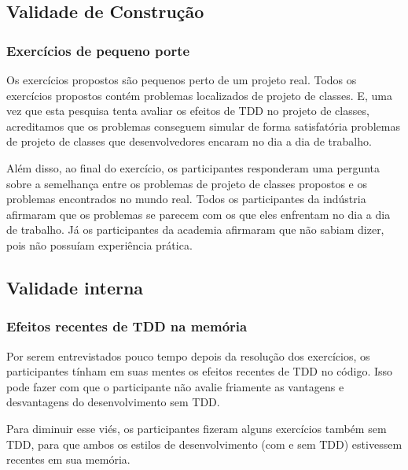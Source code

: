 \documentclass[conference]{IEEEtran}
\begin{document}
\subsection{Validade de Construção}

\subsubsection{Exercícios de pequeno porte}

Os exercícios propostos são pequenos perto de um projeto real. Todos os exercícios propostos contém
problemas localizados de projeto de classes. E, uma vez que esta pesquisa tenta avaliar os 
efeitos de TDD no projeto de classes, 
acreditamos que os problemas conseguem simular de forma satisfatória
problemas de projeto de classes que desenvolvedores encaram no dia a dia de trabalho.

Além disso, ao final do exercício, os participantes responderam uma pergunta sobre a semelhança
entre os problemas de projeto de classes propostos e os problemas encontrados no mundo real.
Todos os participantes da indústria afirmaram que os problemas se parecem com os que eles enfrentam
no dia a dia de trabalho. Já os participantes da academia afirmaram que não sabiam dizer, pois não
possuíam experiência prática.

\subsection{Validade interna}

\subsubsection{Efeitos recentes de TDD na memória}

Por serem entrevistados pouco tempo depois da resolução dos exercícios, os participantes tínham
em suas mentes os efeitos recentes de TDD no código. Isso pode fazer com que o participante
não avalie friamente as vantagens e desvantagens do desenvolvimento sem TDD. 

Para diminuir esse viés, os participantes fizeram alguns exercícios também
sem TDD, para que ambos os estilos de desenvolvimento (com e sem TDD) estivessem
recentes em sua memória.
\end{document}
